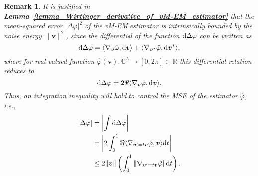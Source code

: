 \documentclass[a4paper,12pt]{article}
\newtheorem{remark}{\bf Remark}
\begin{document}
\begin{remark}
    It is justified in {\bf Lemma~\ref{lemma_Wirtinger_derivative_of_vM-EM_estimator}} that the mean-squared error $|\Delta\varphi|^2$ of the vM-EM estimator is intrinsically bounded by the noise energy $\|{\bm v}\|^2$, since the differential of the function ${\rm d}\Delta\varphi$ can be written as 
    \begin{equation}
        {\rm d}\Delta\varphi = \langle \nabla_{\bm v}\hat{\varphi}, {\rm d}{\bm v}\rangle + \langle \nabla_{{\bm v}^*}\hat{\varphi}, {\rm d}{\bm v}^*\rangle, 
    \end{equation}
    where for real-valued function $\hat{\varphi}({\bm v}): \mathbb{C}^L \to [0,2\pi]\subset \mathbb{R}$ this differential relation reduces to 
    \begin{equation}
        {\rm d}\Delta\varphi = 2\Re\langle\nabla_{\bm v}\hat{\varphi}, {\rm d}{\bm v}\rangle. 
        \label{eqn:differential_of_error}
    \end{equation}
    Thus, an integration inequality will hold to control the MSE of the estimator $\hat{\varphi}$, i.e., 
    \begin{equation}
        \begin{aligned}
            |\Delta{\varphi}| &= \left| \int {\rm d}\Delta\varphi \right| \\
            &= \left| 2\int_{0}^{1} \Re\langle\nabla_{{\bm v}'=t {\bm v}}\hat{\varphi}, {\bm v}\rangle{\rm d}t \right| \\
            &\leq 2\|{\bm v}\| \left(\int_{0}^{1} \|\nabla_{{\bm v}'=t{\bm v}}\hat{\varphi} \| {\rm d} t \right). 
        \end{aligned}
        \label{ineq:gradient_bound}
    \end{equation}
\end{remark}
\end{document}

